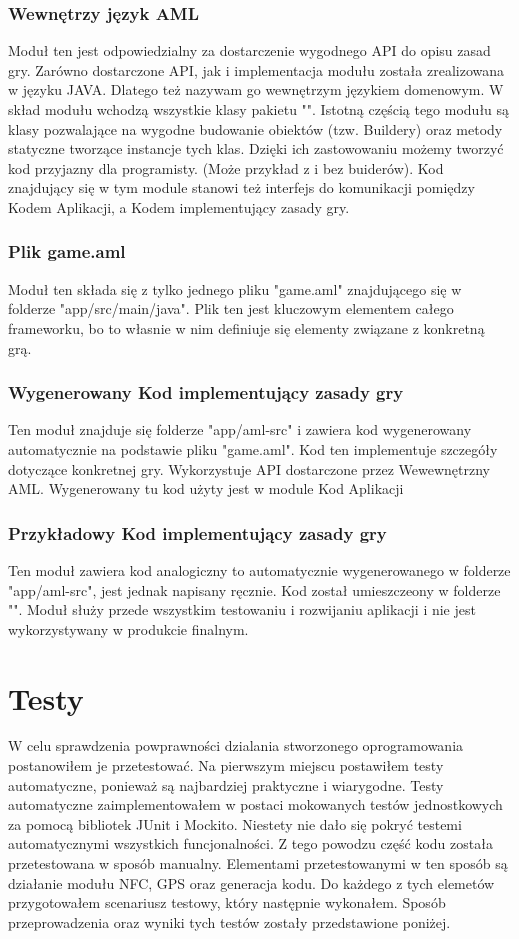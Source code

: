 \documentclass	{xmgr}
\begin{document}
\subsection{Wewnętrzy język AML}
Moduł ten jest odpowiedzialny za dostarczenie wygodnego API do opisu zasad gry. Zarówno dostarczone API, jak i implementacja modułu została zrealizowana w języku JAVA. Dlatego też nazywam go wewnętrzym językiem domenowym.
W skład modułu wchodzą wszystkie klasy pakietu "".
Istotną częścią tego modułu są klasy pozwalające na wygodne budowanie obiektów (tzw. Buildery) oraz metody statyczne tworzące instancje tych klas. Dzięki ich zastowowaniu możemy tworzyć kod przyjazny dla programisty. (Może przykład z i bez buiderów).
Kod znajdujący się w tym module stanowi też interfejs do komunikacji pomiędzy Kodem Aplikacji, a Kodem implementujący zasady gry.

\subsection{Plik game.aml}
Moduł ten składa się z tylko jednego pliku "game.aml" znajdującego się w folderze "app/src/main/java". Plik ten jest kluczowym elementem całego frameworku, bo to własnie w nim definiuje się elementy związane z konkretną grą.

\subsection{Wygenerowany Kod implementujący zasady gry}
Ten moduł znajduje się folderze "app/aml-src" i zawiera kod wygenerowany automatycznie na podstawie pliku "game.aml". Kod ten implementuje szczegóły dotyczące konkretnej gry. Wykorzystuje API dostarczone przez Wewewnętrzny AML. Wygenerowany tu kod użyty jest w module Kod Aplikacji

\subsection{Przykładowy Kod implementujący zasady gry}
Ten moduł zawiera kod analogiczny to automatycznie wygenerowanego w folderze "app/aml-src", jest jednak napisany ręcznie. Kod został umieszczeony w folderze "". Moduł służy przede wszystkim testowaniu i rozwijaniu aplikacji i nie jest wykorzystywany w produkcie finalnym.

\chapter{Testy} 
W celu sprawdzenia powprawności dzialania stworzonego oprogramowania postanowiłem je przetestować. Na pierwszym miejscu postawiłem testy automatyczne, ponieważ są najbardziej praktyczne i wiarygodne. Testy automatyczne zaimplementowałem w postaci mokowanych testów jednostkowych za pomocą bibliotek JUnit i Mockito.
Niestety nie dało się pokryć testemi automatycznymi wszystkich funcjonalności. Z tego powodzu część kodu została przetestowana w sposób manualny. Elementami przetestowanymi w ten sposób są działanie modułu NFC, GPS oraz generacja kodu. Do każdego z tych elemetów przygotowałem scenariusz testowy, który następnie wykonałem. Sposób przeprowadzenia oraz wyniki tych testów zostały przedstawione poniżej.
\end{document}
